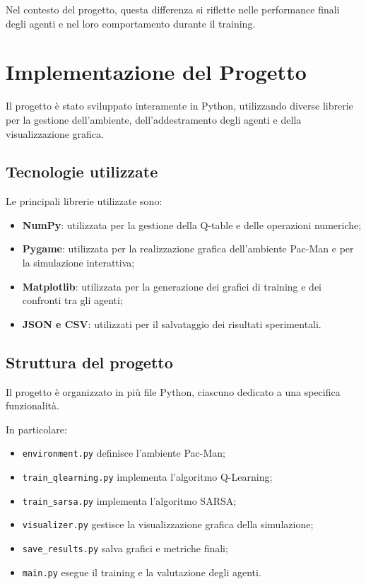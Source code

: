 \documentclass[12pt,a4paper]{report}
\begin{document}
Nel contesto del progetto, questa differenza si riflette nelle performance finali degli agenti e nel loro comportamento durante il training.

\chapter{Implementazione del Progetto}

Il progetto è stato sviluppato interamente in Python, utilizzando diverse librerie per la gestione dell’ambiente, dell’addestramento degli agenti e della visualizzazione grafica.

\section{Tecnologie utilizzate}

Le principali librerie utilizzate sono:

\begin{itemize}
    \item \textbf{NumPy}: utilizzata per la gestione della Q-table e delle operazioni numeriche;
    
    \item \textbf{Pygame}: utilizzata per la realizzazione grafica dell’ambiente Pac-Man e per la simulazione interattiva;
    
    \item \textbf{Matplotlib}: utilizzata per la generazione dei grafici di training e dei confronti tra gli agenti;
    
    \item \textbf{JSON e CSV}: utilizzati per il salvataggio dei risultati sperimentali.
\end{itemize}

\section{Struttura del progetto}

Il progetto è organizzato in più file Python, ciascuno dedicato a una specifica funzionalità.

In particolare:

\begin{itemize}
    \item \texttt{environment.py} definisce l’ambiente Pac-Man;
    
    \item \texttt{train\_qlearning.py} implementa l’algoritmo Q-Learning;
    
    \item \texttt{train\_sarsa.py} implementa l’algoritmo SARSA;
    
    \item \texttt{visualizer.py} gestisce la visualizzazione grafica della simulazione;
    
    \item \texttt{save\_results.py} salva grafici e metriche finali;
    
    \item \texttt{main.py} esegue il training e la valutazione degli agenti.
\end{itemize}
\end{document}
